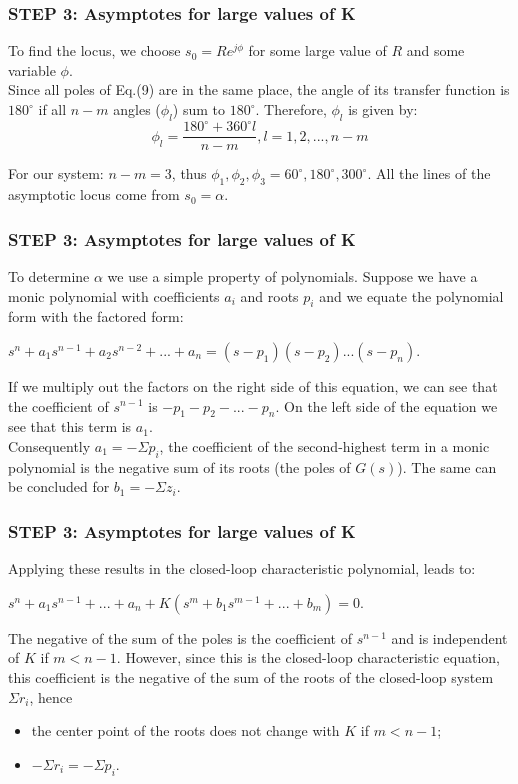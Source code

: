 \begin{frame}	
\frametitle{STEP 3: Asymptotes for large values of K}
\justify
	To find the locus, we choose $s_0 = Re^{j\phi}$ for some large value of $R$ and some variable $\phi$.\\
	\vspace{1em}
	Since all poles of Eq.(9) are in the same place, the angle of its transfer function is $180^{\circ}$ if all $n-m$ angles ($\phi_l$) sum to $180^{\circ}$. Therefore, $\phi_l$ is given by: 
	\begin{equation}
	\phi_l = \frac{180^{\circ} + 360^{\circ}l}{n-m}, l = 1,2,...,n-m
	\end{equation}	
	\vspace{-0.5em}	
	\begin{exampleblock}{}
	For our system: $n-m=3$, thus $\phi_1, \phi_2, \phi_3 = 60^{\circ}, 180^{\circ}, 300^{\circ}$.
	All the lines of the asymptotic locus come from $s_0 = \alpha$.
	\end{exampleblock}
\end{frame}

\begin{frame}
\frametitle{STEP 3: Asymptotes for large values of K}
\justify
	To determine $\alpha$ we use a simple property of polynomials. Suppose we have a monic polynomial with coefficients $a_i$ and roots $p_i$ and we equate the polynomial form with the factored form:
	\begin{center}
		$s^n + a_1s^{n-1} + a_2s^{n-2} + ... + a_n = (s-p_1)(s-p_2)...(s-p_n).$
	\end{center}
	If we multiply out the factors on the right side of this equation, we can see that the coefficient of $s^{n-1}$ is $-p_1 - p_2 - ... - p_n$. On the left side of the equation we see that this term is $a_1$.\\
	\vspace{1em}
	Consequently $a_1 = -\Sigma p_i$, the coefficient of the second-highest term in a monic polynomial is the negative sum of its roots (the poles of $G(s)$). The same can be concluded for $b_1 = -\Sigma z_i$.
\end{frame}

\begin{frame}
\frametitle{STEP 3: Asymptotes for large values of K}
\justify
	Applying these results in the closed-loop characteristic polynomial, leads to:
	\begin{center}
		$s^n + a_1 s^{n-1} + ... + a_n + K(s^m + b_1 s^{m-1} + ... + b_m) = 0$.
	\end{center}
	The negative of the sum of the poles is the coefficient of $s^{n-1}$ and is independent of $K$ if $m < n-1$. However, since this is the closed-loop characteristic equation, this coefficient is the negative of the sum of the roots of the closed-loop system $\Sigma r_i$, hence
	\begin{itemize}
		\item the center point of the roots does not change with $K$ if $m < n-1$;
		\item $-\Sigma r_i = -\Sigma p_i$.
	\end{itemize}
\end{frame}

